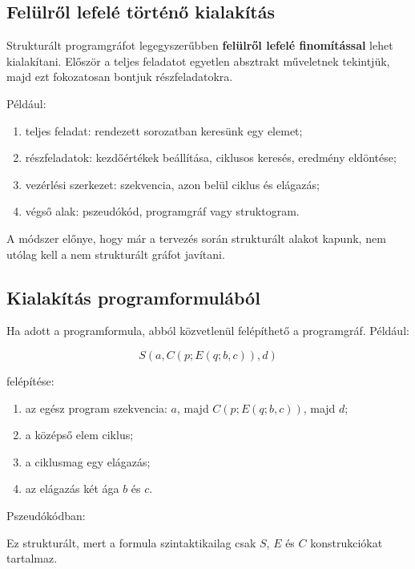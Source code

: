 \subsection{Felülről lefelé történő kialakítás}

Strukturált programgráfot legegyszerűbben \textbf{felülről lefelé finomítással} lehet kialakítani. Először a teljes feladatot egyetlen absztrakt műveletnek tekintjük, majd ezt fokozatosan bontjuk részfeladatokra.

Például:

\begin{enumerate}
  \item teljes feladat: rendezett sorozatban keresünk egy elemet;
  \item részfeladatok: kezdőértékek beállítása, ciklusos keresés, eredmény eldöntése;
  \item vezérlési szerkezet: szekvencia, azon belül ciklus és elágazás;
  \item végső alak: pszeudókód, programgráf vagy struktogram.
\end{enumerate}

A módszer előnye, hogy már a tervezés során strukturált alakot kapunk, nem utólag kell a nem strukturált gráfot javítani.

\subsection{Kialakítás programformulából}

Ha adott a programformula, abból közvetlenül felépíthető a programgráf. Például:

\[
S(a,C(p;E(q;b,c)),d)
\]

felépítése:

\begin{enumerate}
  \item az egész program szekvencia: $a$, majd $C(p;E(q;b,c))$, majd $d$;
  \item a középső elem ciklus;
  \item a ciklusmag egy elágazás;
  \item az elágazás két ága $b$ és $c$.
\end{enumerate}

Pszeudókódban:


Ez strukturált, mert a formula szintaktikailag csak $S$, $E$ és $C$ konstrukciókat tartalmaz.


